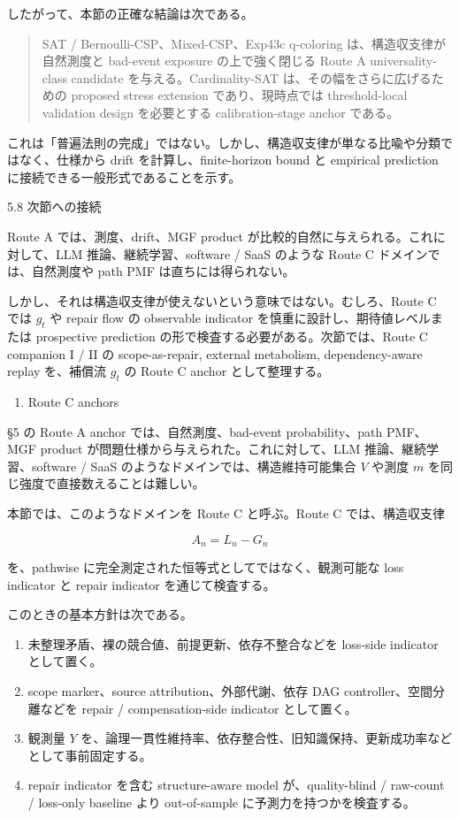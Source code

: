 \documentclass[12pt,a4paper]{article}
\begin{document}
したがって、本節の正確な結論は次である。

\begin{quote}
SAT / Bernoulli-CSP、Mixed-CSP、Exp43c q-coloring は、構造収支律が自然測度と bad-event exposure の上で強く閉じる Route A universality-class candidate を与える。Cardinality-SAT は、その幅をさらに広げるための proposed stress extension であり、現時点では threshold-local validation design を必要とする calibration-stage anchor である。
\end{quote}

これは「普遍法則の完成」ではない。しかし、構造収支律が単なる比喩や分類ではなく、仕様から drift を計算し、finite-horizon bound と empirical prediction に接続できる一般形式であることを示す。

5.8 次節への接続

Route A では、測度、drift、MGF product が比較的自然に与えられる。これに対して、LLM 推論、継続学習、software / SaaS のような Route C ドメインでは、自然測度や path PMF は直ちには得られない。

しかし、それは構造収支律が使えないという意味ではない。むしろ、Route C では \(g_{t}\) や repair flow の observable indicator を慎重に設計し、期待値レベルまたは prospective prediction の形で検査する必要がある。次節では、Route C companion I / II の scope-as-repair, external metabolism, dependency-aware replay を、補償流 \(g_{t}\) の Route C anchor として整理する。

\begin{enumerate}
\def\labelenumi{\arabic{enumi}.}
\setcounter{enumi}{5}
\tightlist
\item
  Route C anchors
\end{enumerate}

§5 の Route A anchor では、自然測度、bad-event probability、path PMF、MGF product が問題仕様から与えられた。これに対して、LLM 推論、継続学習、software / SaaS のようなドメインでは、構造維持可能集合 \(V\) や測度 \(m\) を同じ強度で直接数えることは難しい。

本節では、このようなドメインを Route C と呼ぶ。Route C では、構造収支律

\[
A_{n}=L_{n}-G_{n}
\]

を、pathwise に完全測定された恒等式としてではなく、観測可能な loss indicator と repair indicator を通じて検査する。

このときの基本方針は次である。

\begin{enumerate}
\def\labelenumi{\arabic{enumi}.}
\tightlist
\item
  未整理矛盾、裸の競合値、前提更新、依存不整合などを loss-side indicator として置く。
\item
  scope marker、source attribution、外部代謝、依存 DAG controller、空間分離などを repair / compensation-side indicator として置く。
\item
  観測量 \(Y\) を、論理一貫性維持率、依存整合性、旧知識保持、更新成功率などとして事前固定する。
\item
  repair indicator を含む structure-aware model が、quality-blind / raw-count / loss-only baseline より out-of-sample に予測力を持つかを検査する。
\end{enumerate}
\end{document}
